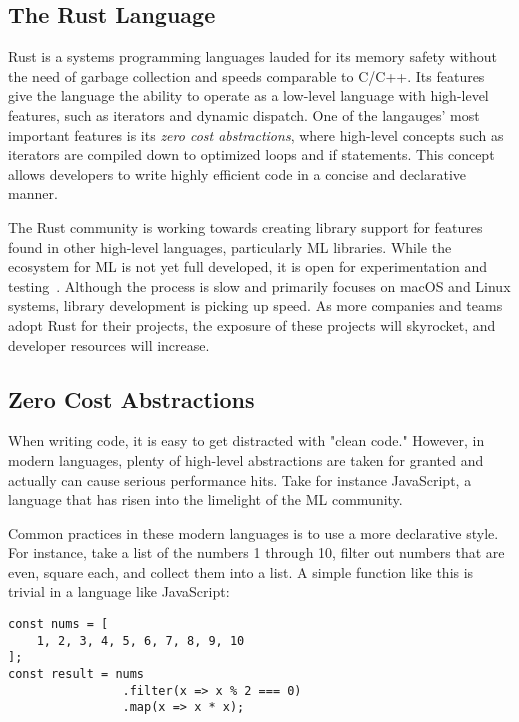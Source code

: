 \begin{multicols}{2}
\tableofcontents
\section{The Rust Language}
Rust is a systems programming languages lauded for its memory safety without the need of garbage collection and speeds
comparable to C/C++. Its features give the language the ability to operate as a low-level language with high-level
features, such as iterators and dynamic dispatch. One of the langauges' most important features is its \textit{zero cost
abstractions}, where high-level concepts such as iterators are compiled down to optimized loops and if statements. This
concept allows developers to write highly efficient code in a concise and declarative manner.

The Rust community is working towards creating library support for features found in other high-level languages,
particularly ML libraries. While the ecosystem for ML is not yet full developed, it is open for experimentation and
testing~\cite{arewelearningyet}. Although the process is slow and primarily focuses on macOS and Linux systems, library
development is picking up speed. As more companies and teams adopt Rust for their projects, the exposure of these
projects will skyrocket, and developer resources will increase.

\subsection{Zero Cost Abstractions}
When writing code, it is easy to get distracted with "clean code." However, in modern languages, plenty of high-level
abstractions are taken for granted and actually can cause serious performance hits. Take for instance JavaScript, a
language that has risen into the limelight of the ML community.

Common practices in these modern languages is to use a more declarative style. For instance, take a list of the numbers
1 through 10, filter out numbers that are even, square each, and collect them into a list. A simple function like this
is trivial in a language like JavaScript:

\vspace{\baselineskip}
\noindent
\begin{minipage}[]{\linewidth}
\begin{verbatim}
const nums = [
    1, 2, 3, 4, 5, 6, 7, 8, 9, 10
];
const result = nums
                .filter(x => x % 2 === 0)
                .map(x => x * x);
\end{verbatim}
\end{minipage}
\vspace{\baselineskip}


\end{multicols}
